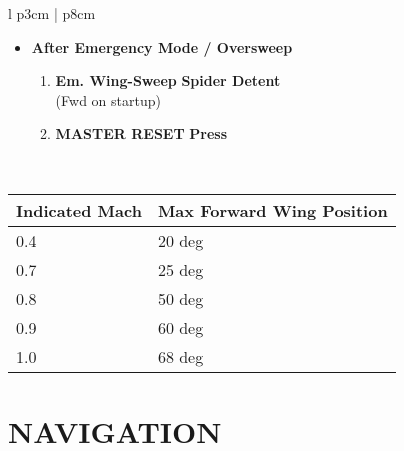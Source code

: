 \documentclass[fontHelvetica, widesubsec]{TechCheck}
\begin{document}
\begin{center}
\begin{longtable}{l p{3cm} | p{8cm}}
\begin{minipage}[t]{\linewidth}
				\begin{itemize}
					\item \textbf{After Emergency Mode / Oversweep}
					\begin{enumerate}
						\item \textbf{Em. Wing-Sweep} \dotfill \textbf{Spider Detent} \\
						\hfill (Fwd on startup)
						\item \textbf{MASTER RESET} \dotfill \textbf{Press}
					\end{enumerate}
				\end{itemize}
			\end{minipage} \\
			\bottomrule
		\end{longtable}
	\end{center}
	\begin{center}
		\begin{tabular}{p{3cm} | p{5cm}}
			\toprule
			\textbf{Indicated Mach} & \textbf{Max Forward Wing Position} \\
			\midrule
			0.4 & 20 deg \\
			\midrule
			0.7 & 25 deg \\
			\midrule
			0.8 & 50 deg \\
			\midrule
			0.9 & 60 deg \\
			\midrule
			1.0 & 68 deg \\
			\bottomrule
		\end{tabular}
	\end{center}

	\clearpage

	\section{NAVIGATION}
\end{document}

